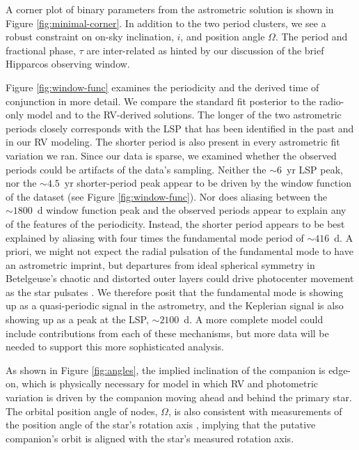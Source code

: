 \documentclass[twocolumn]{aastex631}
\begin{document}
A corner plot of binary parameters from the astrometric solution is shown in Figure \ref{fig:minimal-corner}. In addition to the two period clusters, we see a robust constraint on on-sky inclination, $i$, and position angle $\Omega$. The period and fractional phase, $\tau$ are inter-related as hinted by our discussion of the brief  Hipparcos observing window. 

Figure \ref{fig:window-func} examines the periodicity and the derived time of conjunction in more detail. We compare the standard fit posterior to the radio-only model and to the RV-derived solutions. The longer of the two astrometric periods closely corresponds with the LSP that has been identified in the past and in our RV modeling. The shorter period is also present in every astrometric fit variation we ran. 
Since our data is  sparse, we  examined whether the observed periods could be artifacts of the data's sampling. Neither the $\sim 6$~yr LSP peak, nor the $\sim 4.5$~yr shorter-period peak appear to be driven by the window function of the dataset (see Figure \ref{fig:window-func}).  Nor does aliasing between the $\sim 1800$~d window function peak and the observed periods appear to explain any of the features of the periodicity. 
Instead, the shorter period appears to be best explained by aliasing with four times the fundamental mode period of $\sim 416$~d. A priori, we might not expect the radial pulsation of the fundamental mode to have an astrometric imprint, but departures from ideal spherical symmetry in Betelgeuse's chaotic and distorted outer layers could drive photocenter movement as the star pulsates \citep[e.g.][]{2009A&A...506.1351C,2010A&A...515A..12C,2011A&A...528A.120C,2012JCoPh.231..919F,2017A&A...600A.137F,2023A&A...669A..49A}.  We therefore posit that the fundamental mode is showing up as a quasi-periodic signal in the astrometry, and the Keplerian signal is also showing up as a peak at the LSP, $\sim 2100$~d. A more complete model could include contributions from each of these mechanisms, but more data will be needed to support this more sophisticated analysis. 


As shown in Figure \ref{fig:angles}, the implied inclination of the companion is edge-on, which is physically necessary for model in which RV and photometric variation is driven by the companion moving ahead and behind the primary star. The orbital position angle of nodes, $\Omega$, is also consistent with measurements of the position angle of the star's rotation axis \citep{2018A&A...609A..67K}, implying that the putative companion's orbit is aligned with the star's measured rotation axis. 
\end{document}
